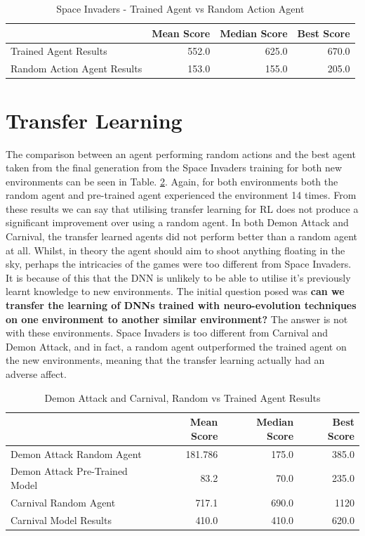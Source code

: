 \begin{table}[ht]
  \centering
  \begin{tabular}{| m{6cm} | r | r | r |}
    \hline
    \rowcolor{black!30} & Mean Score & Median Score & Best Score \\
    \hline
    Trained Agent Results & 552.0 & 625.0 & 670.0 \\
    \hline
    Random Action Agent Results & 153.0 & 155.0 & 205.0 \\
    \hline
  \end{tabular}
  \caption{Space Invaders - Trained Agent vs Random Action Agent}
  \label{ref:sptab}

\end{table}

\section{Transfer Learning}

The comparison between an agent performing random actions and the best agent taken from the final generation from the Space Invaders training for both new environments can be seen in Table. \ref{tab:dac}. Again, for both environments both the random agent and pre-trained agent experienced the environment 14 times. From these results we can say that utilising transfer learning for RL does not produce a significant improvement over using a random agent. In both Demon Attack and Carnival, the transfer learned agents did not perform better than a random agent at all. Whilst, in theory the agent should aim to shoot anything floating in the sky, perhaps the intricacies of the games were too different from Space Invaders. It is because of this that the DNN is unlikely to be able to utilise it's previously learnt knowledge to new environments. The initial question posed was \textbf{can we transfer the learning of DNNs trained with neuro-evolution techniques on one environment to another similar environment?} The answer is not with these environments. Space Invaders is too different from Carnival and Demon Attack, and in fact, a random agent outperformed the trained agent on the new environments, meaning that the transfer learning actually had an adverse affect.

\begin{table} [ht]
  \begin{tabular}{| m{8cm} | r | r | r |}
    \hline
    \rowcolor{black!30} & Mean Score & Median Score & Best Score \\
    \hline
    Demon Attack Random Agent & 181.786 & 175.0 & 385.0 \\
    \hline
    Demon Attack Pre-Trained Model & 83.2 & 70.0 & 235.0 \\
    \hline
    Carnival Random Agent & 717.1 & 690.0 & 1120 \\
    \hline
    Carnival Model Results & 410.0 & 410.0 & 620.0 \\
    \hline
  \end{tabular}
  \caption{Demon Attack and Carnival, Random vs Trained Agent Results}
  \label{tab:dac}
\end{table}
